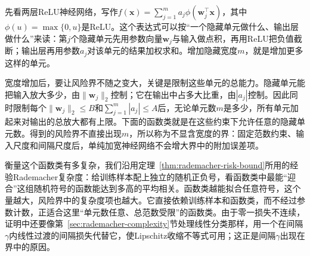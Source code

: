 先看两层ReLU神经网络，写作$f(\bm x)=\sum_{j=1}^m a_j\phi(\bm w_j^\top\bm x)$，其中$\phi(u)=\max\{0,u\}$是ReLU。这个表达式可以按“一个隐藏单元做什么、输出层做什么”来读：第$j$个隐藏单元先用参数向量$\bm w_j$与输入做点积，再用ReLU把负值截断；输出层再用参数$a_j$对该单元的结果加权求和。增加隐藏宽度$m$，就是增加更多这样的单元。

宽度增加后，要让风险界不随之变大，关键是限制这些单元的总能力。隐藏单元能把输入放大多少，由$\|\bm w_j\|_2$控制；它在输出中占多大比重，由$|a_j|$控制。因此同时限制每个$\|\bm w_j\|_2\leq B$和$\sum_{j=1}^m|a_j|\leq A$后，无论单元数$m$是多少，所有单元加起来对输出的总放大都有上限。下面的函数类就是在这些约束下允许任意的隐藏单元数。得到的风险界不直接出现$m$，所以称为不显含宽度的界：固定范数约束、输入尺度和间隔尺度后，单纯加宽神经网络不会增大界中的附加误差项。

衡量这个函数类有多复杂，我们沿用定理~\ref{thm:rademacher-risk-bound}所用的经验Rademacher复杂度：给训练样本配上独立的随机正负号，看函数类中最能“迎合”这组随机符号的函数能达到多高的平均相关。函数类越能拟合任意符号，这个量越大，风险界中的复杂度项也越大。它直接依赖训练样本和函数类，而不经过参数计数，正适合这里“单元数任意、总范数受限”的函数类。由于零一损失不连续，证明中还要像第~\ref{sec:rademacher-complexity}节处理线性分类那样，用一个在间隔$\gamma$内线性过渡的间隔损失代替它，使Lipschitz收缩不等式可用；这正是间隔$\gamma$出现在界中的原因。

